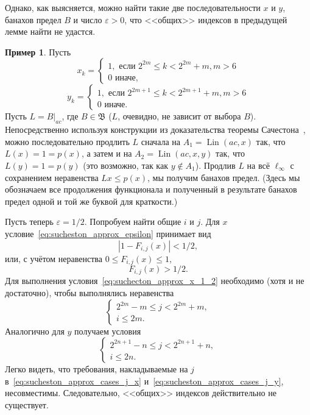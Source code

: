 \documentclass[a4paper,openbib]{report}
\renewcommand{\leq}{\leqslant}
\theoremstyle{definition}
\newtheorem{example}[lemma]{Пример}
\begin{document}
Однако, как выясняется, можно найти такие две последовательности $x$ и $y$,
банахов предел $B$ и число $\varepsilon>0$, что <<общих>> индексов в предыдущей лемме найти не удастся.

\begin{example}
	Пусть
	\begin{equation}
		x_k = \begin{cases}
			1, \mbox{~если~} 2^{2m} \leq k < 2^{2m} + m, m > 6
			\\
			0 \mbox{~иначе,~}
		\end{cases}
	\end{equation}
	\begin{equation}
		y_k = \begin{cases}
			1, \mbox{~если~} 2^{2m+1} \leq k < 2^{2m+1} + m, m > 6
			\\
			0 \mbox{~иначе.}
		\end{cases}
	\end{equation}
	Пусть $L = B|_{ac}$, где $B\in\mathfrak{B}$ ($L$, очевидно, не зависит от выбора $B$).
	Непосредственно используя конструкции из доказательства теоремы Сачестона~\cite{sucheston1967banach},
	можно последовательно продлить $L$ сначала на $A_1 = \operatorname{Lin}(ac, x)$
	так, что $L(x) = 1 = p(x)$,
	а затем и на $A_2 = \operatorname{Lin}(ac, x,y)$
	так, что $L(y) = 1 = p(y)$
	(это возможно, так как $y\notin A_1$).
	Продлив $L$ на всё $\ell_\infty$ с сохранением неравенства $Lx\leq p(x)$,
	мы получим банахов предел.
	(Здесь мы обозначаем все продолжения функционала и полученный в результате банахов предел одной и той же буквой
	для краткости.)

	Пусть теперь $\varepsilon = 1/2$.
	Попробуем найти общие $i$ и $j$.
	Для $x$ условие~\eqref{eq:sucheston_approx_epsilon} принимает вид
	\begin{equation}
		|1 - F_{i,j}(x)| < 1/2
		,
	\end{equation}
	или, с учётом неравенства $0 \leq F_{i,j}(x) \leq 1$,
	\begin{equation}
		\label{eq:suchecton_approx_x_1_2}
		F_{i,j}(x) > 1/2
		.
	\end{equation}
	Для выполнения условия~\eqref{eq:suchecton_approx_x_1_2} необходимо (хотя и не достаточно),
	чтобы выполнялись неравенства
	\begin{equation}
		\label{eq:sucheston_approx_cases_j_x}
		\begin{cases}
			 2^{2m} - m \leq j < 2^{2m} + m,
			 \\
			 i \leq 2m
			 .
		\end{cases}
	\end{equation}
	Аналогично для $y$ получаем условия
	\begin{equation}
		\label{eq:sucheston_approx_cases_j_y}
		\begin{cases}
			 2^{2n+1} - n \leq j < 2^{2n+1} + n,
			 \\
			 i \leq 2n
			 .
		\end{cases}
	\end{equation}
	Легко видеть, что требования, накладываемые на $j$ в~\eqref{eq:sucheston_approx_cases_j_x} и~\eqref{eq:sucheston_approx_cases_j_y},
	несовместимы.
	Следовательно, <<общих>> индексов действительно не существует.
\end{example}
\end{document}
